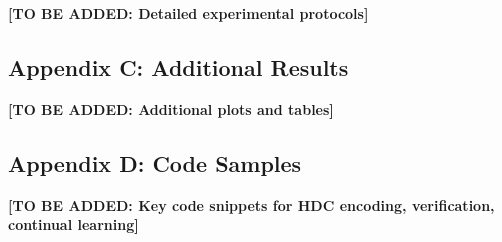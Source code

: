 \documentclass[a4paper,12pt]{article}
\begin{document}
\textbf{[TO BE ADDED: Detailed experimental protocols]}

\subsection{Appendix C: Additional Results}

\textbf{[TO BE ADDED: Additional plots and tables]}

\subsection{Appendix D: Code Samples}

\textbf{[TO BE ADDED: Key code snippets for HDC encoding, verification, continual learning]}

\newpage

\printbibliography
\end{document}
